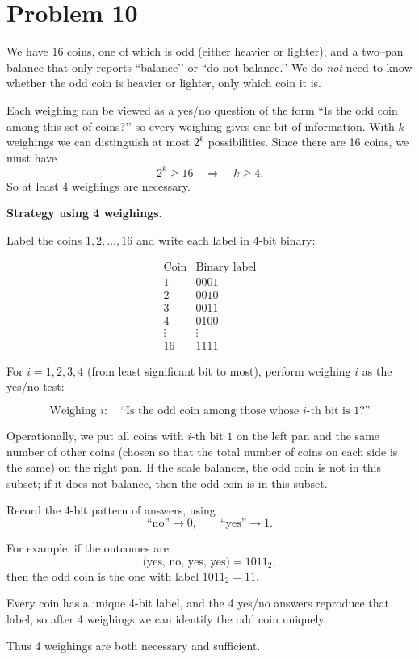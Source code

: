 \section*{Problem 10}

We have 16 coins, one of which is odd (either heavier or lighter), and a two–pan
balance that only reports “balance’’ or “do not balance.’’ We do \emph{not} need
to know whether the odd coin is heavier or lighter, only which coin it is.

Each weighing can be viewed as a yes/no question of the form
“Is the odd coin among this set of coins?’’ so every weighing gives one bit of
information. With \(k\) weighings we can distinguish at most \(2^k\) possibilities.
Since there are 16 coins, we must have
\[
2^k \ge 16 \quad\Rightarrow\quad k \ge 4.
\]
So at least 4 weighings are necessary.

\medskip
\noindent\textbf{Strategy using 4 weighings.}

Label the coins \(1,2,\dots,16\) and write each label in 4-bit binary:

\[
\begin{array}{c|c}
\text{Coin} & \text{Binary label}\\\hline
1 & 0001\\
2 & 0010\\
3 & 0011\\
4 & 0100\\
\vdots & \vdots\\
16&1111
\end{array}
\]

For \(i=1,2,3,4\) (from least significant bit to most), perform weighing \(i\) as
the yes/no test:

\[
\text{Weighing }i:\quad
\text{``Is the odd coin among those whose $i$-th bit is $1$?''}
\]

Operationally, we put all coins with \(i\)-th bit \(1\) on the left pan and the
same number of other coins (chosen so that the total number of coins on each
side is the same) on the right pan. If the scale balances, the odd coin is not
in this subset; if it does not balance, then the odd coin is in this subset.

Record the 4-bit pattern of answers, using
\[
\text{``no''} \to 0,\qquad \text{``yes''} \to 1.
\]

For example, if the outcomes are
\[
\text{(yes, no, yes, yes)} = 1011_2,
\]
then the odd coin is the one with label \(1011_2 = 11\).

Every coin has a unique 4-bit label, and the 4 yes/no answers reproduce that
label, so after 4 weighings we can identify the odd coin uniquely.

\medskip
Thus 4 weighings are both necessary and sufficient.
